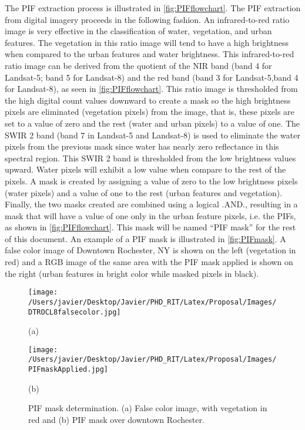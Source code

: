 The PIF extraction process is illustrated in \autoref{fig:PIFflowchart}. The PIF extraction from digital imagery proceeds in the following fashion. An infrared-to-red ratio image is very effective in the classification of water, vegetation, and urban features. The vegetation in this ratio image will tend to have a high brightness when compared to the urban features and water brightness. This infrared-to-red ratio image can be derived from the quotient of the NIR band (band 4 for Landsat-5; band 5 for Landsat-8) and the red band (band 3 for Landsat-5,band 4 for Landsat-8), as seen in \autoref{fig:PIFflowchart}. This ratio image is thresholded from the high digital count values downward to create a mask so the high brightness pixels are eliminated (vegetation pixels) from the image, that is, these pixels are set to a value of zero and the rest (water and urban pixels) to a value of one. The SWIR 2 band (band 7 in Landsat-5 and Landsat-8) is used to eliminate the water pixels from the previous mask since water has nearly zero reflectance in this spectral region. This SWIR 2 band is thresholded from the low brightness values upward. Water pixels will exhibit a low value when compare to the rest of the pixels. A mask is created by assigning a value of zero to the low brightness pixels (water pixels) and a value of one to the rest (urban features and vegetation). Finally, the two masks created are combined using a logical .AND., resulting in a mask that will have a value of one only in the urban feature pixels, i.e. the PIFs, as shown in \autoref{fig:PIFflowchart}. This mask will be named ``PIF mask'' for the rest of this document. An example of a PIF mask is illustrated in \autoref{fig:PIFmask}. A false color image of Downtown Rochester, NY is shown on the left (vegetation in red) and a RGB image of the same area with the PIF mask applied is shown on the right (urban features in bright color while masked pixels in black).

\begin{figure}[htb]
  \begin{minipage}[c]{0.48\linewidth}
    \centering
      \texttt{[image: /Users/javier/Desktop/Javier/PHD\_RIT/Latex/Proposal/Images/DTROCL8falsecolor.jpg]}  
    \centerline{(a)}\medskip
  \end{minipage}
  \hfill
  \begin{minipage}[d]{0.48\linewidth}
    \centering
      \texttt{[image: /Users/javier/Desktop/Javier/PHD\_RIT/Latex/Proposal/Images/PIFmaskApplied.jpg]}
    \centerline{(b)}\medskip
  \end{minipage}
  \caption{PIF mask determination. (a) False color image, with vegetation in red and (b) PIF mask over downtown Rochester. \label{fig:PIFmask} } 
\end{figure}

